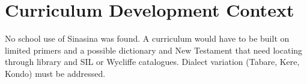 \documentclass[12pt]{article}
\begin{document}
\section{Curriculum Development Context}
No school use of Sinasina was found. A curriculum would have to be built on limited primers and a possible dictionary and New Testament that need locating through library and SIL or Wycliffe catalogues. Dialect variation (Tabare, Kere, Kondo) must be addressed.
\end{document}
